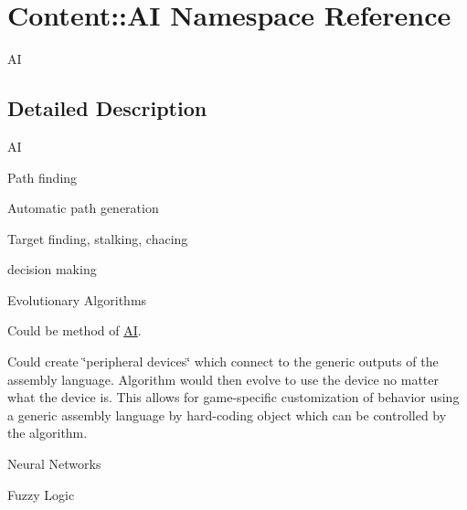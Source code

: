 \hypertarget{namespaceContent_1_1AI}{
\section{Content::AI Namespace Reference}
\label{namespaceContent_1_1AI}
}


AI  


\subsection{Detailed Description}
AI 
\begin{DoxyItemize}
\item Path finding
\item Automatic path generation
\item Target finding, stalking, chacing
\item decision making
\item Evolutionary Algorithms
\begin{DoxyItemize}
\item Could be method of \hyperlink{namespaceContent_1_1AI}{AI}.
\item Could create \char`\"{}peripheral devices\char`\"{} which connect to the generic outputs of the assembly language. Algorithm would then evolve to use the device no matter what the device is. This allows for game-\/specific customization of behavior using a generic assembly language by hard-\/coding object which can be controlled by the algorithm.
\end{DoxyItemize}
\item Neural Networks
\item Fuzzy Logic 
\end{DoxyItemize}